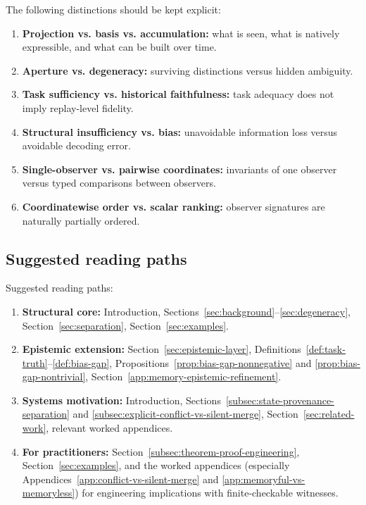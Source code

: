 \documentclass[11pt,twoside]{article}
\theoremstyle{definition}
\begin{document}
The following distinctions should be kept explicit:
\begin{enumerate}[leftmargin=*]
  \item \textbf{Projection vs. basis vs. accumulation:} what is seen, what is natively expressible, and what can be built over time.
  \item \textbf{Aperture vs. degeneracy:} surviving distinctions versus hidden ambiguity.
  \item \textbf{Task sufficiency vs. historical faithfulness:} task adequacy does not imply replay-level fidelity.
  \item \textbf{Structural insufficiency vs. bias:} unavoidable information loss versus avoidable decoding error.
  \item \textbf{Single-observer vs. pairwise coordinates:} invariants of one observer versus typed comparisons between observers.
  \item \textbf{Coordinatewise order vs. scalar ranking:} observer signatures are naturally partially ordered.
\end{enumerate}

\subsection{Suggested reading paths}
\label{app:reading-paths}

Suggested reading paths:
\begin{enumerate}[leftmargin=*]
  \item \textbf{Structural core:} Introduction, Sections~\ref{sec:background}--\ref{sec:degeneracy}, Section~\ref{sec:separation}, Section~\ref{sec:examples}.
  \item \textbf{Epistemic extension:} Section~\ref{sec:epistemic-layer}, Definitions~\ref{def:task-truth}--\ref{def:bias-gap}, Propositions~\ref{prop:bias-gap-nonnegative} and \ref{prop:bias-gap-nontrivial}, Section~\ref{app:memory-epistemic-refinement}.
  \item \textbf{Systems motivation:} Introduction, Sections~\ref{subsec:state-provenance-separation} and \ref{subsec:explicit-conflict-vs-silent-merge}, Section~\ref{sec:related-work}, relevant worked appendices.
  \item \textbf{For practitioners:} Section~\ref{subsec:theorem-proof-engineering}, Section~\ref{sec:examples}, and the worked appendices (especially Appendices~\ref{app:conflict-vs-silent-merge} and \ref{app:memoryful-vs-memoryless}) for engineering implications with finite-checkable witnesses.
\end{enumerate}

\printbibliography
\end{document}
